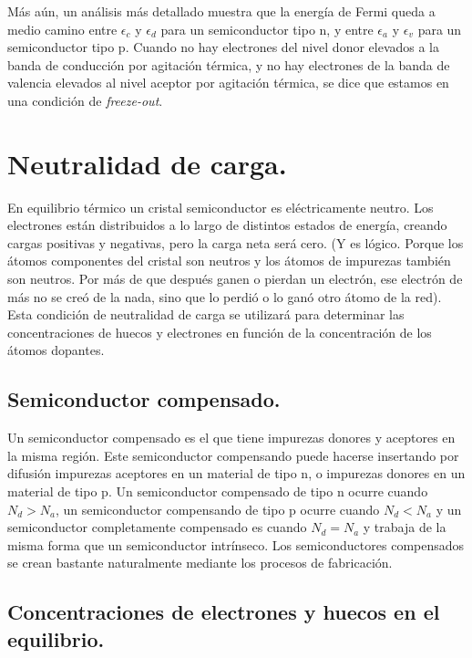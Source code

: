 \documentclass[12pt,a4paper]{article}
\begin{document}
Más aún, un análisis más detallado muestra que la energía de Fermi queda a medio camino entre $\epsilon _{c}$ y $\epsilon _{d}$ para un semiconductor tipo n, y entre $\epsilon _{a}$ y $\epsilon _{v}$ para un semiconductor tipo p. Cuando no hay electrones del nivel donor elevados a la banda de conducción por agitación térmica, y no hay electrones de la banda de valencia elevados al nivel aceptor por agitación térmica, se dice que estamos en una condición de \emph{freeze-out}.

\section{Neutralidad de carga.}

En equilibrio térmico un cristal semiconductor es eléctricamente neutro. Los electrones están distribuidos a lo largo de distintos estados de energía, creando cargas positivas y negativas, pero la carga neta será cero. (Y es lógico. Porque los átomos componentes del cristal son neutros y los átomos de impurezas también son neutros. Por más de que después ganen o pierdan un electrón, ese electrón de más no se creó de la nada, sino que lo perdió o lo ganó otro átomo de la red). Esta condición de neutralidad de carga se utilizará para determinar las concentraciones de huecos y electrones en función de la concentración de los átomos dopantes.

\subsection{Semiconductor compensado.}

Un semiconductor compensado es el que tiene impurezas donores y aceptores en la misma región. Este semiconductor compensando puede hacerse insertando por difusión impurezas aceptores en un material de tipo n, o impurezas donores en un material de tipo p. Un semiconductor compensado de tipo n ocurre cuando $N_{d}>N_{a}$, un semiconductor compensando de tipo p ocurre cuando $N_{d}<N_{a}$ y un semiconductor completamente compensado es cuando $N_{d}=N_{a}$ y trabaja de la misma forma que un semiconductor intrínseco. Los semiconductores compensados se crean bastante naturalmente mediante los procesos de fabricación.

\subsection{Concentraciones de electrones y huecos en el equilibrio.}
\end{document}
